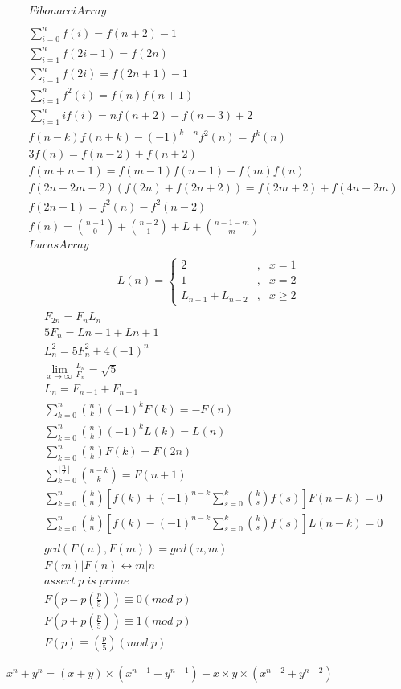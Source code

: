 \begin{align*}
& Fibonacci Array \\
& \\
& \sum_{i=0}^nf(i)=f(n+2)-1 \\
& \sum_{i=1}^nf(2i-1)=f(2n) \\
& \sum_{i=1}^nf(2i)=f(2n+1)-1 \\
& \sum_{i=1}^nf^2(i)=f(n)f(n+1) \\
& \sum_{i=1}^nif(i)=nf(n+2)-f(n+3)+2 \\
& f(n-k)f(n+k)-(-1)^{k-n}f^2(n)=f^k(n) \\
& 3f(n)=f(n-2)+f(n+2) \\
& f(m+n-1)=f(m-1)f(n-1)+f(m)f(n) \\
& f(2n-2m-2)(f(2n)+f(2n+2))=f(2m+2)+f(4n-2m) \\
& f(2n-1)=f^2(n)-f^2(n-2) \\
& f(n)=\binom{n-1}{0}+\binom{n-2}{1}+L+\binom{n-1-m}{m} \\
& Lucas Array \\
\end{align*}
$$ L(n)=\left\{
\begin{aligned}
2 & , & x = 1 \\
1 & , & x = 2 \\
L_{n-1}+L_{n-2} & , & x \geq 2
\end{aligned}
\right.
$$
\begin{align*}
& \\
& F_{2n}=F_nL_n \\
& 5F_n=L{n-1}+L{n+1} \\
& L^2_n=5F_n^2+4(-1)^n \\
& \lim\limits_{x \to \infty} \frac{L_n}{F_n} = \sqrt 5 \\
& L_n=F_{n-1}+F_{n+1} \\
& \sum\limits_{k=0}^{n}\binom n k (-1)^kF(k)=-F(n) \\
& \sum\limits_{k=0}^{n}\binom n k (-1)^kL(k)=L(n) \\
& \sum\limits_{k=0}^{n}\binom n k F(k)=F(2n) \\
& \sum\limits_{k=0}^{\lfloor\frac n 2\rfloor}\binom{n-k}{k}=F(n+1) \\
& \sum\limits_{k=0}^{n}\binom k n[f(k)+(-1)^{n-k}\sum\limits_{s=0}^k\binom k sf(s)]F(n-k)=0 \\
& \sum\limits_{k=0}^{n}\binom k n[f(k)-(-1)^{n-k}\sum\limits_{s=0}^k\binom k sf(s)]L(n-k)=0 \\
& \\
& gcd(F(n),F(m))=gcd(n,m) \\
& F(m)|F(n) \leftrightarrow m|n \\
& assert\;p\;is\;prime \\
& F(p-p\left(\frac p 5 \right))\equiv0(mod\;p) \\
& F(p+p\left(\frac p 5 \right))\equiv1(mod\;p) \\
& F(p)\equiv \left(\frac p 5\right)(mod\;p)
\end{align*}


$x^n+y^n=(x+y) \times (x^{n-1}+y^{n-1})-x \times y\times (x^{n-2}+y^{n-2})$